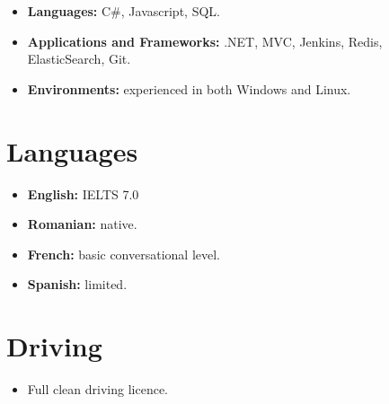 \documentclass[12pt,a4paper]{res}
\begin{document}
\begin{resume}
\begin{itemize}
  \item[] {\bf Languages:} C\#, Javascript, SQL.
  \item[] {\bf Applications and Frameworks:} .NET, MVC, Jenkins, Redis, ElasticSearch, Git.
  \item[] {\bf Environments:} experienced in both Windows and Linux.
  \end{itemize}
\vspace{-3mm}
      
    
\section{Languages}
\vspace{-0.7mm}
\begin{itemize}
\item[] {\bf English:} IELTS 7.0
\item[] {\bf Romanian:} native.
\item[] {\bf French:} basic conversational level.
\item[] {\bf Spanish:} limited. 
\end{itemize}
\vspace{-3mm}

\section{Driving}
\vspace{-0.7mm}
\begin{itemize}
\item[] Full clean driving licence.
\end{itemize}
  \vspace{-3mm}
  
\end{resume}
\end{document}
